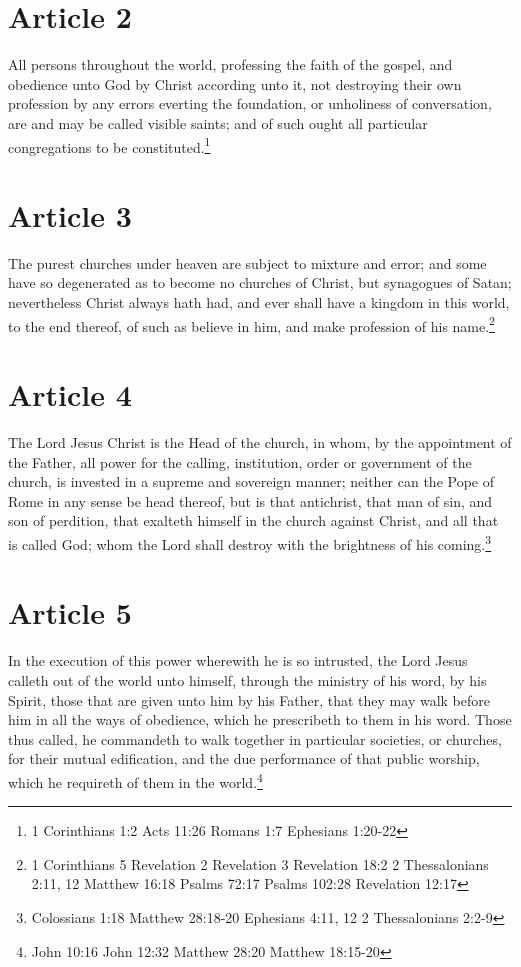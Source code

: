 \documentclass[12pt,letterpaper]{book}
\begin{document}
\section{Article 2}

All persons throughout the world, professing the faith of the gospel, and obedience unto God by Christ according unto it, not destroying their own profession by any errors everting the foundation, or unholiness of conversation, are and may be called visible saints; and of such ought all particular congregations to be constituted.\footnote{1 Corinthians 1:2 Acts 11:26 Romans 1:7 Ephesians 1:20-22}

\section{Article 3}

The purest churches under heaven are subject to mixture and error; and some have so degenerated as to become no churches of Christ, but synagogues of Satan; nevertheless Christ always hath had, and ever shall have a kingdom in this world, to the end thereof, of such as believe in him, and make profession of his name.\footnote{1 Corinthians 5 Revelation 2 Revelation 3 Revelation 18:2 2 Thessalonians 2:11, 12 Matthew 16:18 Psalms 72:17 Psalms 102:28 Revelation 12:17}

\section{Article 4}

The Lord Jesus Christ is the Head of the church, in whom, by the appointment of the Father, all power for the calling, institution, order or government of the church, is invested in a supreme and sovereign manner; neither can the Pope of Rome in any sense be head thereof, but is that antichrist, that man of sin, and son of perdition, that exalteth himself in the church against Christ, and all that is called God; whom the Lord shall destroy with the brightness of his coming.\footnote{Colossians 1:18 Matthew 28:18-20 Ephesians 4:11, 12 2 Thessalonians 2:2-9}

\section{Article 5}

In the execution of this power wherewith he is so intrusted, the Lord Jesus calleth out of the world unto himself, through the ministry of his word, by his Spirit, those that are given unto him by his Father, that they may walk before him in all the ways of obedience, which he prescribeth to them in his word. Those thus called, he commandeth to walk together in particular societies, or churches, for their mutual edification, and the due performance of that public worship, which he requireth of them in the world.\footnote{John 10:16 John 12:32 Matthew 28:20 Matthew 18:15-20}
\end{document}

